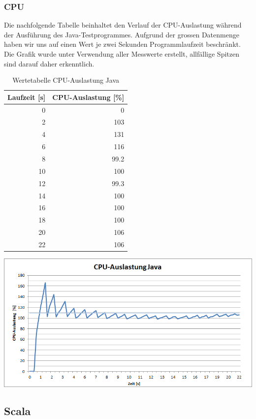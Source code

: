 \documentclass{fancydocument}
\begin{document}
\subsubsection{CPU}
Die nachfolgende Tabelle beinhaltet den Verlauf der CPU-Auslastung während der Ausführung des Java-Testprogrammes. Aufgrund der grossen Datenmenge haben wir uns auf einen Wert je zwei Sekunden Programmlaufzeit beschränkt. Die Grafik wurde unter Verwendung aller Messwerte erstellt, allfällige Spitzen sind darauf daher erkenntlich.
\begin{table}[h!]
\centering
\begin{tabular}{|r|r|} \hline
\textbf{Laufzeit [s]} & \textbf{CPU-Auslastung [\%]}\\
\hline
0 & 0\\
\hline
2 & 103\\
\hline
4 & 131\\
\hline
6 & 116\\
\hline
8 & 99.2\\
\hline
10 & 100\\
\hline
12 & 99.3\\
\hline
14 & 100\\
\hline
16 & 100\\
\hline
18 & 100\\
\hline
20 & 106\\
\hline
22 & 106
\\
\hline
\end{tabular}
\caption{Wertetabelle CPU-Auslastung Java}
\end{table}
\begin{center}
\includegraphics[width=\linewidth]{bilder/CPUJava.png}
\end{center}


\subsection{Scala}
\end{document}

